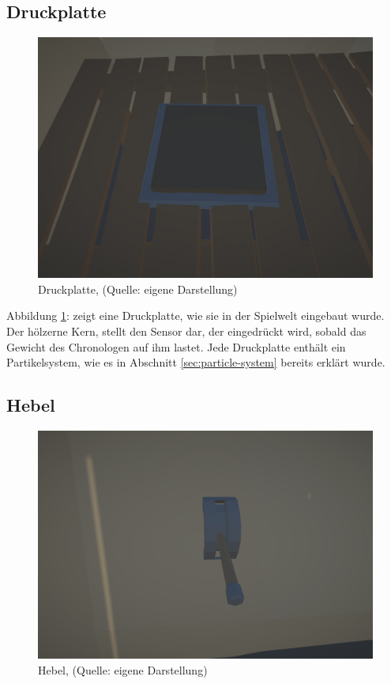 \subsection{Druckplatte}

\begin{figure}[ht]
\centering
\includegraphics[width=0.8\linewidth]{content/pictures/Pressureplate.jpg}
\caption{Druckplatte, (Quelle: eigene Darstellung)}
\label{fig:pressureplate_interactable}
\end{figure}

Abbildung \ref{fig:pressureplate_interactable}:  zeigt eine Druckplatte, wie sie in der Spielwelt eingebaut wurde. Der hölzerne Kern, stellt den Sensor dar, der eingedrückt wird, sobald das Gewicht des Chronologen auf ihm lastet. Jede Druckplatte enthält ein Partikelsystem, wie es in Abschnitt \ref{sec:particle-system}  bereits erklärt wurde.

\subsection{Hebel}

\begin{figure}[ht]
\centering
\includegraphics[width=0.8\linewidth]{content/pictures/Lever.jpg}
\caption{Hebel, (Quelle: eigene Darstellung)}
\label{fig:lever_interactable}
\end{figure}

